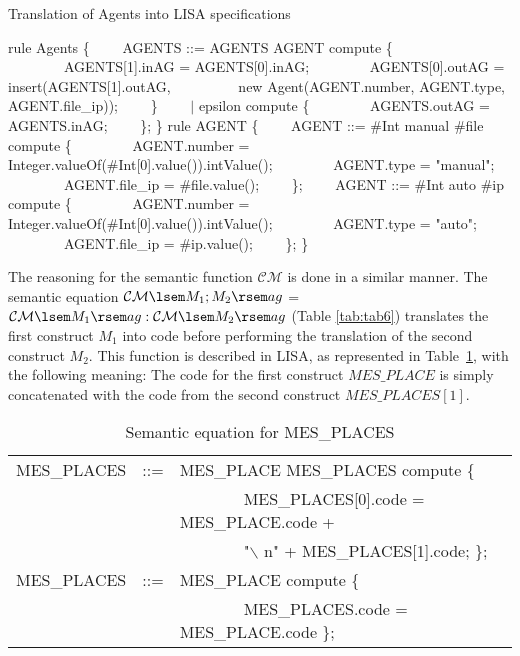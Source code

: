 \documentclass[preprint, prX]{revtex4}
\begin{document}
\begin{algorithm}[tbh]
\caption{Translation of Agents into LISA specifications}
\label{alg:agent_lisa}
\scriptsize
\begin{algorithmic}[1]
\STATE rule Agents \{
\STATE \ \ \ \ AGENTS ::= AGENTS  AGENT compute \{
\STATE \ \ \ \ \ \ \ \ AGENTS[1].inAG = AGENTS[0].inAG;
\STATE \ \ \ \ \ \ \ \ AGENTS[0].outAG = insert(AGENTS[1].outAG,
\STATE \ \ \ \ \ \ \ \ \ new Agent(AGENT.number, AGENT.type, AGENT.file\_ip));
\STATE \ \ \ \ \}
\STATE \ \ \ \ $|$ epsilon compute \{
\STATE \ \ \ \ \ \ \ \ AGENTS.outAG = AGENTS.inAG;
\STATE \ \ \ \ \};
\STATE \}
\STATE rule AGENT \{
\STATE \ \ \ \ AGENT ::= \#Int manual \#file \; compute \{
\STATE \ \ \ \ \ \ \ \ AGENT.number = Integer.valueOf(\#Int[0].value()).intValue();
\STATE \ \ \ \ \ \ \ \ AGENT.type = "manual";
\STATE \ \ \ \ \ \ \ \ AGENT.file\_ip = \#file.value();
\STATE \ \ \ \ \};
\STATE \ \ \ \ AGENT ::= \#Int auto \#ip \; compute \{
\STATE \ \ \ \ \ \ \ \ AGENT.number = Integer.valueOf(\#Int[0].value()).intValue();
\STATE \ \ \ \ \ \ \ \ AGENT.type = "auto";
\STATE \ \ \ \ \ \ \ \ AGENT.file\_ip = \#ip.value();
\STATE \ \ \ \ \};
\STATE \}
\end{algorithmic}
\normalsize
\end{algorithm}

The reasoning for the semantic function $\mathcal{CM}$ is done in a similar manner. The semantic equation $\mathcal{CM} \lsem M_{1}; M_{2} \rsem ag$ = $\mathcal{CM} \lsem M_{1} \rsem ag: \mathcal{CM} \lsem M_{2} \rsem ag$ (Table \ref{tab:tab6}) translates the first construct $M_1$ into code before performing the translation of the second construct $M_2$. This function is described in LISA, as represented in Table~\ref{tab:tab25b}, with the following meaning: The code for the first construct $\mathit{MES\_PLACE}$ is simply concatenated with the code from the second construct $MES\_PLACES[1]$.

\begin{table}[htb]           \caption{Semantic equation for MES\_PLACES}
\label{tab:tab25b}
\vspace{-5mm}
\footnotesize
\begin{center}
\begin{tabular}{ | l  l  l | }
\hline
MES\_PLACES & ::= & MES\_PLACE MES\_PLACES compute \{ \\
 & & \ \ \ \ \ \ \ \ MES\_PLACES[0].code = MES\_PLACE.code + \\
 & & \ \ \ \ \ \ \ \ "$\backslash$ n"  + MES\_PLACES[1].code; \}; \\
MES\_PLACES & ::= & MES\_PLACE compute \{ \\
 & & \ \ \ \ \ \ \ \ MES\_PLACES.code = MES\_PLACE.code \}; \\
\hline
\end{tabular}
\end{center}
\normalsize
\vspace{-5mm}
\end{table}
\end{document}
